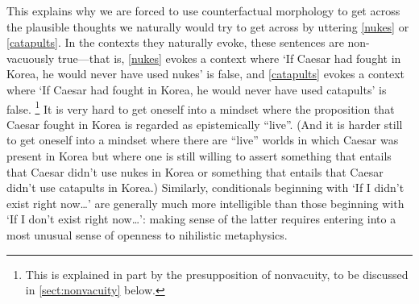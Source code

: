 \documentclass[If.tex]{subfiles}
\begin{document}
This explains why we are forced to use counterfactual morphology to get across the plausible thoughts we naturally would try to get across by uttering \ref{nukes} or \ref{catapults}.  In the contexts they naturally evoke, these sentences are non-vacuously true---that is, \ref{nukes} evokes a context where ‘If Caesar had fought in Korea, he would never have used nukes’ is false, and \ref{catapults} evokes a context where ‘If Caesar had fought in Korea, he would never have used catapults’ is false.%
\footnote{This is explained in part by the presupposition of nonvacuity, to be discussed in \autoref{sect:nonvacuity} below.}
It is very hard to get oneself into a mindset where the proposition that Caesar fought in Korea is regarded as epistemically “live”.  (And it is harder still to get oneself into a mindset where there are “live” worlds in which Caesar was present in Korea but where one is still willing to assert something that entails that Caesar didn't use nukes in Korea or something that entails that Caesar didn't use catapults in Korea.)  Similarly, conditionals beginning with ‘If I didn't exist right now\ldots{}’ are generally much more intelligible than those beginning with ‘If I don't exist right now\ldots{}’: making sense of the latter requires entering into a most unusual sense of openness to nihilistic metaphysics.
\end{document}

